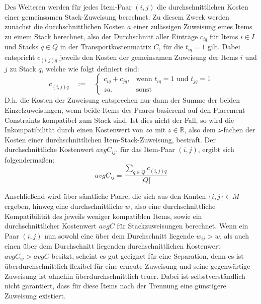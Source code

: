 Des Weiteren werden für jedes Item-Paar $(i, j)$ die durchschnittlichen Kosten einer gemeinsamen Stack-Zuweisung berechnet.
Zu diesem Zweck werden zunächst die durchschnittlichen Kosten $a$ einer zulässigen Zuweisung eines Items zu einem Stack berechnet,
also der Durchschnitt aller Einträge $c_{iq}$ für Items $i \in I$ und Stacks $q \in Q$ in der Transportkostenmatrix $C$, für
die $t_{iq} = 1$ gilt. Dabei entspricht $c_{(i, j)q}$ jeweils den Kosten der gemeinsamen Zuweisung der Items $i$ und $j$ zu Stack $q$,
welche wie folgt definiert sind:
\[
    c_{(i, j)q} \quad := \quad
\begin{cases}
    c_{iq} + c_{jq}, & \text{wenn $t_{iq} = 1$ und $t_{jq} = 1$}\\
    za, & \text{sonst}
\end{cases}
\]
D.h. die Kosten der Zuweisung entsprechen nur dann der Summe der beiden Einzelzuweisungen, wenn beide Items des Paares basierend
auf den Placement-Constraints kompatibel zum Stack sind. Ist dies nicht der Fall, so wird die Inkompatibilität durch
einen Kostenwert von $za$ mit $z \in \mathbb{R}$, also dem $z$-fachen der Kosten einer durchschnittlichen Item-Stack-Zuweisung, bestraft. Der durchschnittliche Kostenwert $avgC_{ij}$, für das Item-Paar $(i, j)$, ergibt sich folgendermaßen:
\[ avgC_{ij} = \frac{\sum_{q \in Q} c_{(i, j)q}}{|Q|}  \]

Anschließend wird über sämtliche Paare, die sich aus den Kanten $\{i, j\} \in M$ ergeben, hinweg eine durchschnittliche  $w$, also eine durchschnittliche Kompatibilität des jeweils weniger kompatiblen Items, sowie ein durchschnittlicher Kostenwert $avgC$ für Stackzuweisungen berechnet. Wenn ein Paar $(i, j)$ nun sowohl eine über dem Durchschnitt liegende  $w_{ij} > w$, als auch einen über dem Durchschnitt liegenden durchschnittlichen Kostenwert $avgC_{ij} > avgC$ besitzt, scheint es gut geeignet für eine Separation,
denn es ist überdurchschnittlich flexibel für eine erneute Zuweisung und seine gegenwärtige Zuweisung ist ohnehin überdurchschnittlich teuer.
Dabei ist selbstverständlich nicht garantiert, dass für diese Items nach der Trennung eine günstigere Zuweisung existiert.

